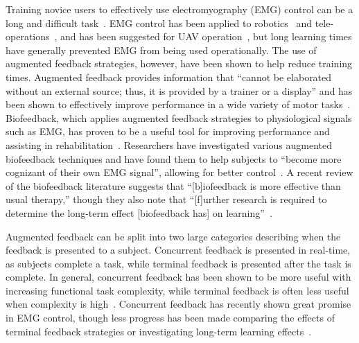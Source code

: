 
Training novice users to effectively use electromyography (EMG) control can be a long and difficult task~\citep{RN24}.
EMG control has been applied to robotics~\citep{RN15, RN16, RN17, RN18} and tele-operations~\citep{RN19}, and has been suggested for UAV operation~\citep{RN14}, but long learning times have generally prevented EMG from being used operationally.
The use of augmented feedback strategies, however, have been shown to help reduce training times.
Augmented feedback provides information that ``cannot be elaborated without an external source; thus, it is provided by a trainer or a display'' and has been shown to effectively improve performance in a wide variety of motor tasks~\citep{sigrist_augmented_2013}.
Biofeedback, which applies augmented feedback strategies to physiological signals such as EMG, has proven to be a useful tool for improving performance and assisting in rehabilitation~\citep{RN26}.
Researchers have investigated various augmented biofeedback techniques and have found them to help subjects to ``become more cognizant of their own EMG signal'', allowing for better control~\citep{RN27}.
A recent review of the biofeedback literature suggests that ``[b]iofeedback is more effective than usual therapy,'' though they also note that ``[f]urther research is required to determine the long-term effect [biofeedback has] on learning''~\citep{RN28}.

Augmented feedback can be split into two large categories describing when the feedback is presented to a subject.
Concurrent feedback is presented in real-time, as subjects complete a task, while terminal feedback is presented after the task is complete.
In general, concurrent feedback has been shown to be more useful with increasing functional task complexity, while terminal feedback is often less useful when complexity is high~\citep{sigrist_augmented_2013}.
Concurrent feedback has recently shown great promise in EMG control, though less progress has been made comparing the effects of terminal feedback strategies or investigating long-term learning effects~\citep{RN29, RN30, RN31, RN32}.

